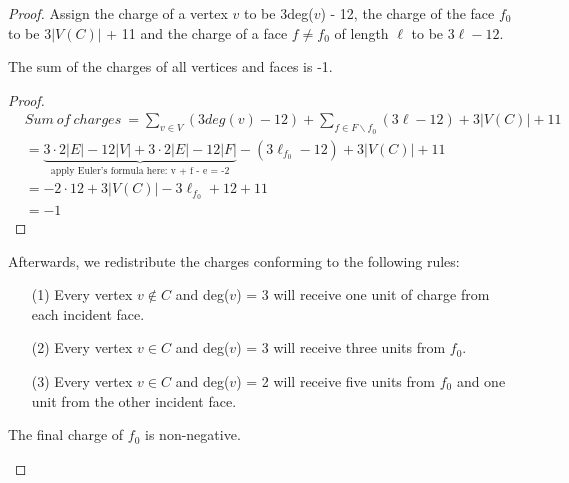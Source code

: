 \begin{proof}
Assign the charge of a vertex $v$ to be 3deg($v$) - 12, the charge of the face $f_0$ to be $3|V(C)|$ + 11 and the charge of a face $f \ne f_0$ of length $\ell$ to be $3 \ell - 12$. 
    \begin{claim}
    The sum of the charges of all vertices and faces is -1.
    \end{claim}
    \begin{proof}
        \begin{align*}
            & Sum \ of \ charges \ = \sum_{v \in V}(3deg(v) - 12) + \sum_{f \in F \backslash {f_0}} (3\ell - 12) + 3|V(C)| + 11 \\
            &= \underbrace{3 \cdot 2|E| - 12 |V| + 3\cdot2|E| - 12|F|}_{\text{apply Euler's formula here: v + f - e = -2}} - (3\ell_{f_0} - 12) + 3|V(C)| + 11 \\
            &=-2 \cdot 12 + 3|V(C)|- 3\ell_{f_0} + 12 + 11\\
            &= -1
        \end{align*}
    \end{proof}
    Afterwards, we redistribute the charges conforming to the following rules:
    \begin{itemize}
        \item[(1)] Every vertex $v \notin C$ and deg($v$) = 3 will receive one unit of charge from each incident face.
        \item[(2)] Every vertex $v \in C$ and deg($v$) = 3 will receive three units from $f_0$.
        \item[(3)] Every vertex $v \in C$ and deg($v$) = 2 will receive five units from $f_0$ and one unit from the other incident face. 
    \end{itemize}
    
    \begin{claim}
    The final charge of $f_0$ is non-negative.
    \end{claim}
    

\end{proof}
